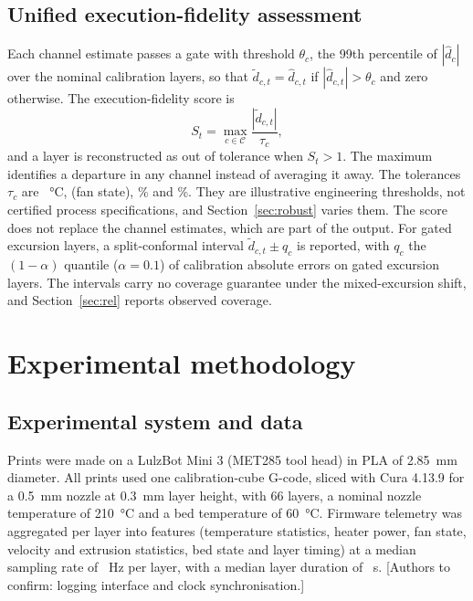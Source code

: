 \documentclass[10pt,a4paper,twocolumn]{article}
\begin{document}
\subsection{Unified execution-fidelity assessment}\label{sec:score}
Each channel estimate passes a gate with threshold $\theta_c$, the 99th percentile of $|\widehat d_{c}|$ over the nominal calibration layers, so that $\tilde d_{c,t}=\widehat d_{c,t}$ if $|\widehat d_{c,t}|>\theta_c$ and zero otherwise. The execution-fidelity score is
\begin{equation}
S_t=\max_{c\in\mathcal{C}}\frac{\left|\tilde d_{c,t}\right|}{\tau_c},
\end{equation}
and a layer is reconstructed as out of tolerance when $S_t>1$. The maximum identifies a departure in any channel instead of averaging it away. The tolerances $\tau_c$ are \tolTh{}~\si{\celsius}, \tolCo{} (fan state), \tolSp{}\% and \tolFl{}\%. They are illustrative engineering thresholds, not certified process specifications, and Section~\ref{sec:robust} varies them. The score does not replace the channel estimates, which are part of the output. For gated excursion layers, a split-conformal interval \cite{Lei2018} $\tilde d_{c,t}\pm q_c$ is reported, with $q_c$ the $(1-\alpha)$ quantile ($\alpha=0.1$) of calibration absolute errors on gated excursion layers. The intervals carry no coverage guarantee under the mixed-excursion shift, and Section~\ref{sec:rel} reports observed coverage.

\section{Experimental methodology}
\subsection{Experimental system and data}
Prints were made on a LulzBot Mini 3 (MET285 tool head) in PLA of \SI{2.85}{mm} diameter. All prints used one calibration-cube G-code, sliced with Cura 4.13.9 for a \SI{0.5}{mm} nozzle at \SI{0.3}{mm} layer height, with 66 layers, a nominal nozzle temperature of \SI{210}{\celsius} and a bed temperature of \SI{60}{\celsius}. Firmware telemetry was aggregated per layer into \nRaw{} features (temperature statistics, heater power, fan state, velocity and extrusion statistics, bed state and layer timing) at a median sampling rate of \samplingHz{}~Hz per layer, with a median layer duration of \layerDur{}~s. [Authors to confirm: logging interface and clock synchronisation.]
\end{document}
